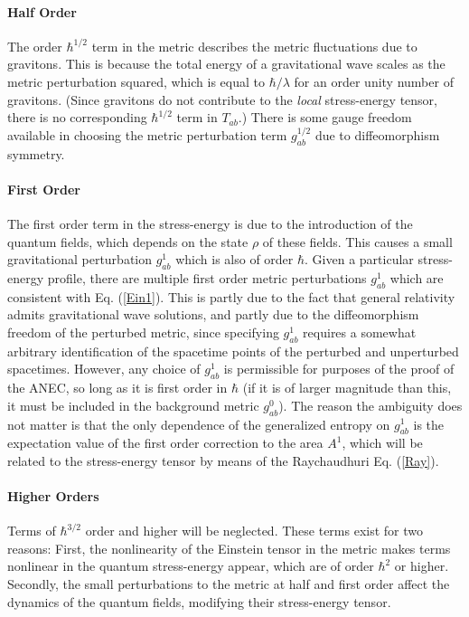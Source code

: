 \documentclass[11pt]{article}
\begin{document}
\paragraph{Half Order}
The order $\hbar^{1/2}$ term in the metric describes the metric fluctuations due to gravitons.  This is because the total energy of a gravitational wave scales as the metric perturbation squared, which is equal to $\hbar / \lambda$ for an order unity number of gravitons.  (Since gravitons do not contribute to the \emph{local} stress-energy tensor, there is no corresponding $\hbar^{1/2}$ term in $T_{ab}$.)  There is some gauge freedom available in choosing the metric perturbation term $g_{ab}^{1/2}$ due to diffeomorphism symmetry.

\paragraph{First Order}
The first order term in the stress-energy is due to the introduction of the quantum fields, which depends on the state $\rho$ of these fields.  This causes a small gravitational perturbation $g_{ab}^{1}$ which is also of order $\hbar$.  Given a particular stress-energy profile, there are multiple first order metric perturbations $g_{ab}^{1}$ which are consistent with Eq. (\ref{Ein1}).  This is partly due to the fact that general relativity admits gravitational wave solutions, and partly due to the diffeomorphism freedom of the perturbed metric, since specifying $g_{ab}^{1}$ requires a somewhat arbitrary identification of the spacetime points of the perturbed and unperturbed spacetimes.  However, any choice of $g_{ab}^{1}$ is permissible for purposes of the proof of the ANEC, so long as it is first order in $\hbar$ (if it is of larger magnitude than this, it must be included in the background metric $g_{ab}^{0}$).  The reason the ambiguity does not matter is that the only dependence of the generalized entropy on $g_{ab}^{1}$ is the expectation value of the first order correction to the area $A^{1}$, which will be related to the stress-energy tensor by means of the Raychaudhuri Eq. (\ref{Ray}).

\paragraph{Higher Orders}
Terms of $\hbar^{3/2}$ order and higher will be neglected.  These terms exist for two reasons:  First, the nonlinearity of the Einstein tensor in the metric makes terms nonlinear in the quantum stress-energy appear, which are of order $\hbar^2$ or higher.  Secondly, the small perturbations to the metric at half and first order affect the dynamics of the quantum fields, modifying their stress-energy tensor.  
\end{document}
